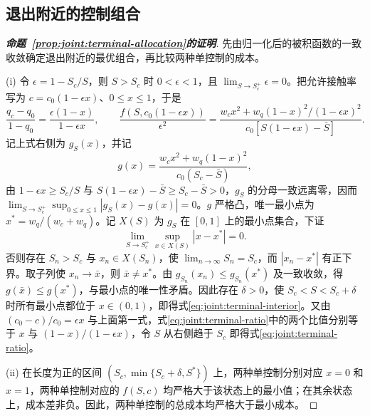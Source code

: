 \subsection{退出附近的控制组合}
\label{sec:proof:terminal-allocation}
\begin{proof}[\normalfont\bfseries 命题~\ref{prop:joint:terminal-allocation}的证明]
先由归一化后的被积函数的一致收敛确定退出附近的最优组合，再比较两种单控制的成本。

(i) 令 $\epsilon=1-S_c/S$，则 $S>S_c$ 时 $0<\epsilon<1$，且 $\lim_{S\to S_c^{+}}\epsilon=0$。把允许接触率写为
$c=c_0(1-\epsilon x)$、$0\le x\le1$，于是
\[
\frac{q_c-q_0}{1-q_0}=\frac{\epsilon(1-x)}{1-\epsilon x},\qquad
\frac{f(S,c_0(1-\epsilon x))}{\epsilon^2}
=\frac{w_cx^2+w_q(1-x)^2/(1-\epsilon x)^2}
{c_0[S(1-\epsilon x)-\bar S]}.
\]
记上式右侧为 $g_S(x)$，并记
\[
g(x)=\frac{w_cx^2+w_q(1-x)^2}{c_0(S_c-\bar S)},
\]
由 $1-\epsilon x\ge S_c/S$ 与 $S(1-\epsilon x)-\bar S\ge S_c-\bar S>0$，$g_S$ 的分母一致远离零，因而 $\lim_{S\to S_c^{+}}\sup_{0\le x\le1}|g_S(x)-g(x)|=0$。$g$ 严格凸，唯一最小点为 $x^*=w_q/(w_c+w_q)$。记 $X(S)$ 为 $g_S$ 在 $[0,1]$ 上的最小点集合，下证
\[
\lim_{S\to S_c^{+}}\sup_{x\in X(S)}|x-x^*|=0.
\]
否则存在 $S_n>S_c$ 与 $x_n\in X(S_n)$，使 $\lim_{n\to\infty}S_n=S_c$，而 $|x_n-x^*|$ 有正下界。取子列使 $x_n\to\bar x$，则 $\bar x\ne x^*$。由 $g_{S_n}(x_n)\le g_{S_n}(x^*)$ 及一致收敛，得 $g(\bar x)\le g(x^*)$，与最小点的唯一性矛盾。因此存在 $\delta>0$，使 $S_c<S<S_c+\delta$ 时所有最小点都位于 $x\in(0,1)$，即得式\eqref{eq:joint:terminal-interior}。又由 $(c_0-c)/c_0=\epsilon x$ 与上面第一式，式\eqref{eq:joint:terminal-ratio}中的两个比值分别等于 $x$ 与 $(1-x)/(1-\epsilon x)$，令 $S$ 从右侧趋于 $S_c$ 即得式\eqref{eq:joint:terminal-ratio}。

(ii) 在长度为正的区间 $(S_c,\min\{S_c+\delta,S^*\})$ 上，两种单控制分别对应 $x=0$ 和 $x=1$，两种单控制对应的 $f(S,c)$ 均严格大于该状态上的最小值；在其余状态上，成本差非负。因此，两种单控制的总成本均严格大于最小成本。
\end{proof}

